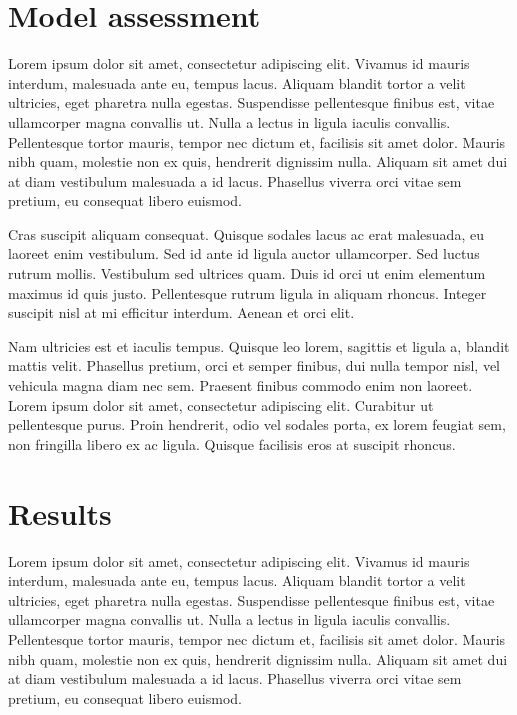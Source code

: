 \documentclass[a4paper, nobind]{templates/ociamthesis}
\theoremstyle{definition}
\theoremstyle{definition}
\theoremstyle{definition}
\theoremstyle{remark}
\begin{document}
\hypertarget{model-assessment}{%
\section{Model assessment}\label{model-assessment}}

Lorem ipsum dolor sit amet, consectetur adipiscing elit. Vivamus id mauris interdum, malesuada ante eu, tempus lacus. Aliquam blandit tortor a velit ultricies, eget pharetra nulla egestas. Suspendisse pellentesque finibus est, vitae ullamcorper magna convallis ut. Nulla a lectus in ligula iaculis convallis. Pellentesque tortor mauris, tempor nec dictum et, facilisis sit amet dolor. Mauris nibh quam, molestie non ex quis, hendrerit dignissim nulla. Aliquam sit amet dui at diam vestibulum malesuada a id lacus. Phasellus viverra orci vitae sem pretium, eu consequat libero euismod.

Cras suscipit aliquam consequat. Quisque sodales lacus ac erat malesuada, eu laoreet enim vestibulum. Sed id ante id ligula auctor ullamcorper. Sed luctus rutrum mollis. Vestibulum sed ultrices quam. Duis id orci ut enim elementum maximus id quis justo. Pellentesque rutrum ligula in aliquam rhoncus. Integer suscipit nisl at mi efficitur interdum. Aenean et orci elit.

Nam ultricies est et iaculis tempus. Quisque leo lorem, sagittis et ligula a, blandit mattis velit. Phasellus pretium, orci et semper finibus, dui nulla tempor nisl, vel vehicula magna diam nec sem. Praesent finibus commodo enim non laoreet. Lorem ipsum dolor sit amet, consectetur adipiscing elit. Curabitur ut pellentesque purus. Proin hendrerit, odio vel sodales porta, ex lorem feugiat sem, non fringilla libero ex ac ligula. Quisque facilisis eros at suscipit rhoncus.

\hypertarget{results}{%
\section{Results}\label{results}}

Lorem ipsum dolor sit amet, consectetur adipiscing elit. Vivamus id mauris interdum, malesuada ante eu, tempus lacus. Aliquam blandit tortor a velit ultricies, eget pharetra nulla egestas. Suspendisse pellentesque finibus est, vitae ullamcorper magna convallis ut. Nulla a lectus in ligula iaculis convallis. Pellentesque tortor mauris, tempor nec dictum et, facilisis sit amet dolor. Mauris nibh quam, molestie non ex quis, hendrerit dignissim nulla. Aliquam sit amet dui at diam vestibulum malesuada a id lacus. Phasellus viverra orci vitae sem pretium, eu consequat libero euismod.
\end{document}
